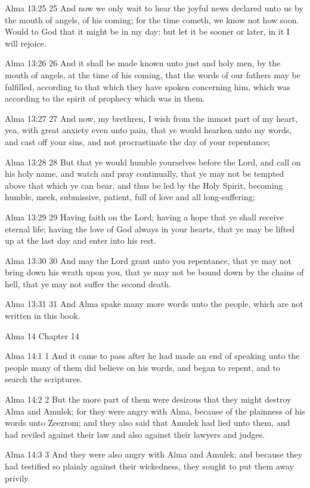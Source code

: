 Alma 13:25
 25 And now we only wait to hear the joyful news declared unto us
by the mouth of angels, of his coming; for the time cometh, we
know not how soon. Would to God that it might be in my day; but
let it be sooner or later, in it I will rejoice.

Alma 13:26
 26 And it shall be made known unto just and holy men, by the
mouth of angels, at the time of his coming, that the words of our
fathers may be fulfilled, according to that which they have
spoken concerning him, which was according to the spirit of
prophecy which was in them.

Alma 13:27
 27 And now, my brethren, I wish from the inmost part of my
heart, yea, with great anxiety even unto pain, that ye would
hearken unto my words, and cast off your sins, and not
procrastinate the day of your repentance;

Alma 13:28
 28 But that ye would humble yourselves before the Lord, and call
on his holy name, and watch and pray continually, that ye may not
be tempted above that which ye can bear, and thus be led by the
Holy Spirit, becoming humble, meek, submissive, patient, full of
love and all long-suffering;

Alma 13:29
 29 Having faith on the Lord; having a hope that ye shall receive
eternal life; having the love of God always in your hearts, that
ye may be lifted up at the last day and enter into his rest.

Alma 13:30
 30 And may the Lord grant unto you repentance, that ye may not
bring down his wrath upon you, that ye may not be bound down by
the chains of hell, that ye may not suffer the second death.

Alma 13:31
 31 And Alma spake many more words unto the people, which are not
written in this book.

Alma 14
Chapter 14

Alma 14:1
 1 And it came to pass after he had made an end of speaking unto
the people many of them did believe on his words, and began to
repent, and to search the scriptures.

Alma 14:2
 2 But the more part of them were desirous that they might
destroy Alma and Amulek; for they were angry with Alma, because
of the plainness of his words unto Zeezrom; and they also said
that Amulek had lied unto them, and had reviled against their law
and also against their lawyers and judges.

Alma 14:3
 3 And they were also angry with Alma and Amulek; and because
they had testified so plainly against their wickedness, they
sought to put them away privily.

